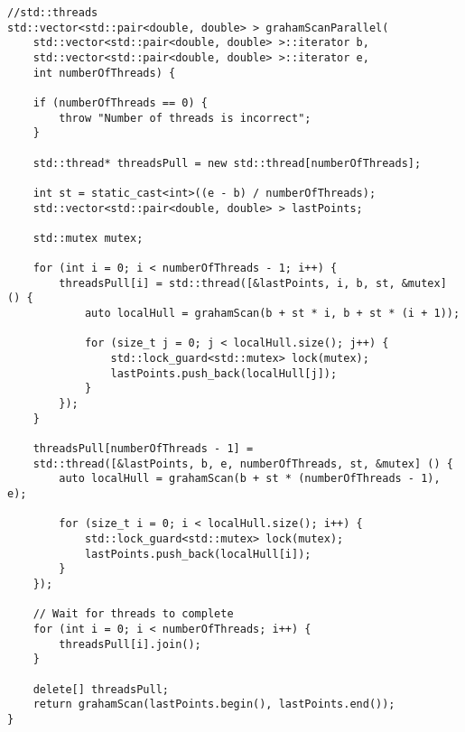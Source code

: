 \documentclass{report}
\begin{document}
\begin{lstlisting}
//std::threads
std::vector<std::pair<double, double> > grahamScanParallel(
    std::vector<std::pair<double, double> >::iterator b,
    std::vector<std::pair<double, double> >::iterator e,
    int numberOfThreads) {

    if (numberOfThreads == 0) {
        throw "Number of threads is incorrect";
    }

    std::thread* threadsPull = new std::thread[numberOfThreads];

    int st = static_cast<int>((e - b) / numberOfThreads);
    std::vector<std::pair<double, double> > lastPoints;

    std::mutex mutex;

    for (int i = 0; i < numberOfThreads - 1; i++) {
        threadsPull[i] = std::thread([&lastPoints, i, b, st, &mutex] () {
            auto localHull = grahamScan(b + st * i, b + st * (i + 1));

            for (size_t j = 0; j < localHull.size(); j++) {
                std::lock_guard<std::mutex> lock(mutex);
                lastPoints.push_back(localHull[j]);
            }
        });
    }

    threadsPull[numberOfThreads - 1] =
    std::thread([&lastPoints, b, e, numberOfThreads, st, &mutex] () {
        auto localHull = grahamScan(b + st * (numberOfThreads - 1), e);

        for (size_t i = 0; i < localHull.size(); i++) {
            std::lock_guard<std::mutex> lock(mutex);
            lastPoints.push_back(localHull[i]);
        }
    });

    // Wait for threads to complete
    for (int i = 0; i < numberOfThreads; i++) {
        threadsPull[i].join();
    }

    delete[] threadsPull;
    return grahamScan(lastPoints.begin(), lastPoints.end());
}
\end{lstlisting}
\end{document}
